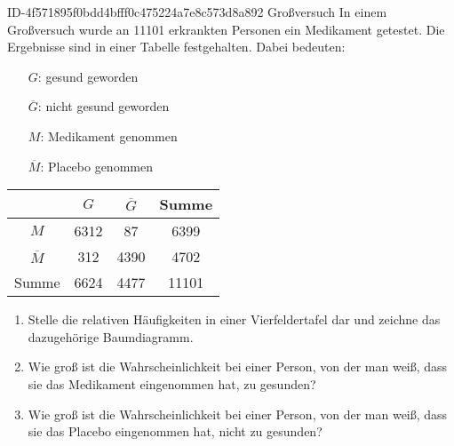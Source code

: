 \begin{exercise}
      {ID-4f571895f0bdd4bfff0c475224a7e8c573d8a892}
      {Großversuch}
  \ifproblem\problem
    In einem Großversuch wurde an \num{11101} erkrankten Personen ein Medikament
    getestet. Die Ergebnisse sind in einer Tabelle festgehalten. Dabei bedeuten:\par
    \begin{minipage}{0.5\linewidth}
      \begin{itemize}
        \setlength{\itemsep}{-0.1\baselineskip}
        \item[$G$:]            gesund geworden
        \item[$\overline{G}$:] nicht gesund geworden
        \item[$M$:]            Medikament genommen
        \item[$\overline{M}$:] Placebo genommen
      \end{itemize}
    \end{minipage}%
    \begin{minipage}{0.45\linewidth}
      \centering
      \renewcommand{\arraystretch}{1.25}
      \begin{tabular}{|c|c|c|c|}
        \hline
                       & $G$        & $\overline{G}$ & Summe       \\
        \hline
        $M$            & \num{6312} & \num{87}       & \num{6399}  \\
        \hline
        $\overline{M}$ & \num{312}  & \num{4390}     & \num{4702}  \\
        \hline
        Summe          & \num{6624} & \num{4477}     & \num{11101} \\
        \hline
      \end{tabular}
    \end{minipage}\par
    \begin{enumerate}
      \item Stelle die relativen Häufigkeiten in einer Vierfeldertafel dar
            und zeichne das dazugehörige Baumdiagramm.
      \item Wie groß ist die Wahrscheinlichkeit bei einer Person, von der
            man weiß, dass sie das Medikament eingenommen hat, zu gesunden?
      \item Wie groß ist die Wahrscheinlichkeit bei einer Person, von der
            man weiß, dass sie das Placebo eingenommen hat, nicht zu gesunden?
    \end{enumerate}
  \fi
\end{exercise}
